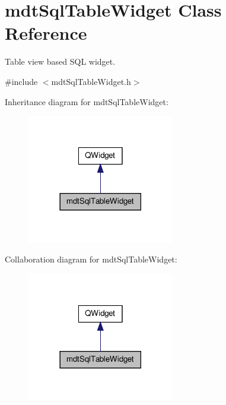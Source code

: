 \hypertarget{classmdt_sql_table_widget}{\section{mdt\-Sql\-Table\-Widget Class Reference}
\label{classmdt_sql_table_widget}
}


Table view based S\-Q\-L widget.  




{\ttfamily \#include $<$mdt\-Sql\-Table\-Widget.\-h$>$}



Inheritance diagram for mdt\-Sql\-Table\-Widget\-:
\nopagebreak
\begin{figure}[H]
\begin{center}
\leavevmode
\includegraphics[width=182pt]{classmdt_sql_table_widget__inherit__graph}
\end{center}
\end{figure}


Collaboration diagram for mdt\-Sql\-Table\-Widget\-:
\nopagebreak
\begin{figure}[H]
\begin{center}
\leavevmode
\includegraphics[width=182pt]{classmdt_sql_table_widget__coll__graph}
\end{center}
\end{figure}
